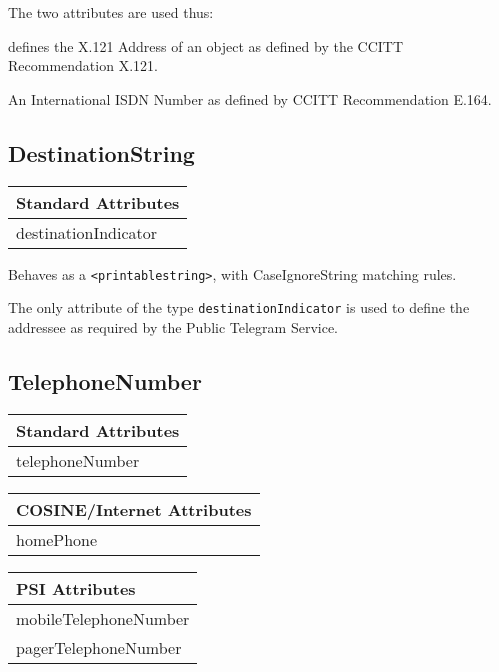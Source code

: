 The two attributes are used thus:
\begin{describe}
\item[\verb+x121Address+:] defines the X.121 Address of an object as defined by the
CCITT Recommendation X.121.
\item[\verb+internationaliSDNNumber+:]
An International ISDN Number as defined by CCITT Recommendation E.164.
\end{describe}

\subsection{DestinationString}
\begin{center}\small
\begin{tabular}{|l|}\hline
Standard Attributes \\ \hline
	destinationIndicator\\
\hline
\end{tabular}
\end{center}
Behaves as a \verb+<printablestring>+, with CaseIgnoreString matching rules.

The only attribute of the type \verb+destinationIndicator+ is used to define
the addressee as required by the Public Telegram Service.

\subsection{TelephoneNumber}
\begin{center}\small
\begin{tabular}{|l|}\hline
Standard Attributes \\ \hline
	telephoneNumber\\ 
\hline
\end{tabular}
\begin{tabular}{|l|}\hline
COSINE/Internet Attributes \\ \hline
	homePhone\\
\hline
\end{tabular}
\end{center}
\begin{center}\small\begin{tabular}{|l|}\hline
PSI Attributes \\ \hline
	mobileTelephoneNumber\\
	pagerTelephoneNumber\\
\hline
\end{tabular}
\end{center}

